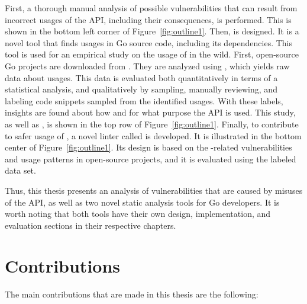 


First, a thorough manual analysis of possible vulnerabilities that can result from incorrect usages of the \unsafe{}
\acrshort{API}, including their consequences, is performed.
This is shown in the bottom left corner of Figure~\ref{fig:outline1}.
Then, \toolGeiger{} is designed.
It is a novel tool that finds \unsafe{} usages in Go source code, including its dependencies.
This tool is used for an empirical study on the usage of \unsafe{} in the wild.
First, open-source Go projects are downloaded from \github{}.
They are analyzed using \toolGeiger{}, which yields raw data about \unsafe{} usages.
This data is evaluated both quantitatively in terms of a statistical analysis, and qualitatively by sampling,
manually reviewing, and labeling code snippets sampled from the identified \unsafe{} usages.
With these labels, insights are found about how and for what purpose the \unsafe{} \acrshort{API} is used.
This study, as well as \toolGeiger{}, is shown in the top row of Figure~\ref{fig:outline1}.
Finally, to contribute to safer usage of \unsafe{}, a novel linter called \toolSafer{} is developed.
It is illustrated in the bottom center of Figure~\ref{fig:outline1}.
Its design is based on the \unsafe{}-related vulnerabilities and \unsafe{} usage patterns in open-source projects,
and it is evaluated using the labeled data set.

Thus, this thesis presents an analysis of vulnerabilities that are caused by misuses of the \unsafe{} \acrshort{API},
as well as two novel static analysis tools for Go developers.
It is worth noting that both tools have their own design, implementation, and evaluation sections in their respective
chapters.



\section{Contributions}\label{sec:introduction:contributions}

The main contributions that are made in this thesis are the following:

